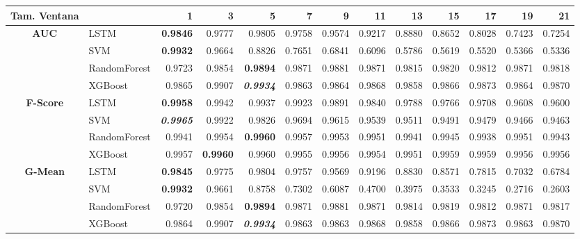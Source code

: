 \begin{table}[H]
	\centering
	\begin{adjustbox}{max width=12cm}
		\begin{tabular}{|c|l|r|r|r|r|r|r|r|r|r|r|r|}
			\hline
			\textbf{Tam. Ventana}&         &      1  &      3  &      5  &      7  &      9  &      11 &      13 &      15 &      17 &      19 &      21 \\
			\hline
			\textbf{AUC} &  LSTM & \textbf{  0.9846 } &  0.9777 &  0.9805 &  0.9758 &  0.9574 &  0.9217 &  0.8880 &  0.8652 &  0.8028 &  0.7423 &  0.7254 \\
			&  SVM & \textbf{  0.9932 } &  0.9664 &  0.8826 &  0.7651 &  0.6841 &  0.6096 &  0.5786 &  0.5619 &  0.5520 &  0.5366 &  0.5336 \\
			&  RandomForest &  0.9723 &  0.9854 & \textbf{  0.9894 } &  0.9871 &  0.9881 &  0.9871 &  0.9815 &  0.9820 &  0.9812 &  0.9871 &  0.9818 \\
			&  XGBoost &  0.9865 &  0.9907 & \textit{ \textbf{  0.9934 } } &  0.9863 &  0.9864 &  0.9868 &  0.9858 &  0.9866 &  0.9873 &  0.9864 &  0.9870 \\
			\hline
			\textbf{F-Score} &  LSTM & \textbf{  0.9958 } &  0.9942 &  0.9937 &  0.9923 &  0.9891 &  0.9840 &  0.9788 &  0.9766 &  0.9708 &  0.9608 &  0.9600 \\
			&  SVM & \textit{ \textbf{  0.9965 } } &  0.9922 &  0.9826 &  0.9694 &  0.9615 &  0.9539 &  0.9511 &  0.9491 &  0.9479 &  0.9466 &  0.9463 \\
			&  RandomForest &  0.9941 &  0.9954 & \textbf{  0.9960 } &  0.9957 &  0.9953 &  0.9951 &  0.9941 &  0.9945 &  0.9938 &  0.9951 &  0.9943 \\
			&  XGBoost &  0.9957 & \textbf{  0.9960 } &  0.9960 &  0.9955 &  0.9956 &  0.9954 &  0.9951 &  0.9959 &  0.9959 &  0.9956 &  0.9956 \\
			\hline
			\textbf{G-Mean} &  LSTM & \textbf{  0.9845 } &  0.9775 &  0.9804 &  0.9757 &  0.9569 &  0.9196 &  0.8830 &  0.8571 &  0.7815 &  0.7032 &  0.6784 \\
			&  SVM & \textbf{  0.9932 } &  0.9661 &  0.8758 &  0.7302 &  0.6087 &  0.4700 &  0.3975 &  0.3533 &  0.3245 &  0.2716 &  0.2603 \\
			&  RandomForest &  0.9720 &  0.9854 & \textbf{  0.9894 } &  0.9871 &  0.9881 &  0.9871 &  0.9814 &  0.9819 &  0.9812 &  0.9871 &  0.9817 \\
			&  XGBoost &  0.9864 &  0.9907 & \textit{ \textbf{  0.9934 } } &  0.9863 &  0.9863 &  0.9868 &  0.9858 &  0.9866 &  0.9873 &  0.9863 &  0.9870 \\

\end{tabular}
\end{adjustbox}
\end{table}
